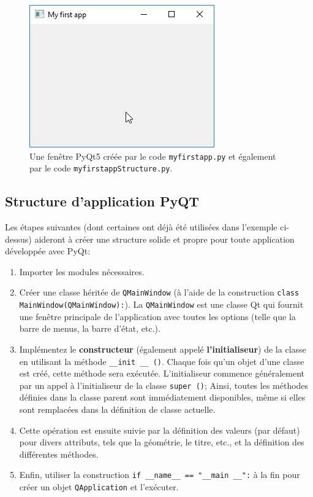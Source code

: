 \documentclass[%
oneside,                 %
final,                   %
10pt,french]{article}
\begin{document}
\begin{figure}[!ht]  %
  \centerline{\includegraphics[width=0.4\linewidth]{imgs/myfirstapp.png}}
  \caption{
  Une fenêtre PyQt5 créée par le code \texttt{myfirstapp.py} et également par le code \texttt{myfirstappStructure.py}. \label{fig:myfirstapp}
  }
\end{figure}


\subsection{Structure d'application PyQT}

Les étapes suivantes (dont certaines ont déjà été utilisées dans l'exemple ci-dessus) aideront à créer une structure solide et propre pour toute application développée avec PyQt:

\begin{enumerate}
\item Importer les modules nécessaires.

\item Créer une classe héritée de \texttt{QMainWindow} (à l'aide de la construction \texttt{class MainWindow(QMainWindow):}). La \texttt{QMainWindow} est une classe Qt qui fournit une fenêtre principale de l’application avec toutes les options (telle que la barre de menus, la barre d’état, etc.).

\item Implémentez le \textbf{constructeur} (également appelé \textbf{l'initialiseur}) de la classe en utilisant la méthode \Verb!__init __ ()!. Chaque fois qu'un objet d'une classe est créé, cette méthode sera exécutée. L'initialiseur commence généralement par un appel à l'initialiseur de la classe \texttt{super ()}; Ainsi, toutes les méthodes définies dans la classe parent sont immédiatement disponibles, même si elles sont remplacées dans la définition de classe actuelle.

\item Cette opération est ensuite suivie par la définition des valeurs (par défaut) pour divers attributs, tels que la géométrie, le titre, etc., et la définition des différentes méthodes.

\item Enfin, utiliser la construction \Verb!if __name__ == "__main __":! à la fin pour créer un objet \texttt{QApplication} et l'exécuter.
\end{enumerate}
\end{document}
